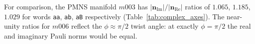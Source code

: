 \documentclass[epjc3]{svjour3}
\begin{document}
\noindent
For comparison, the PMNS manifold $m003$ has
$|\mathbf{n}_{\mathrm{Im}}|/|\mathbf{n}_{\mathrm{Re}}|$
ratios of $1.065$, $1.185$, $1.029$ for words
\texttt{aa}, \texttt{ab}, \texttt{aB} respectively
(Table~\ref{tab:complex_axes}).
The near-unity ratios for $m006$ reflect the $\phi \approx \pi/2$
twist angle: at exactly $\phi = \pi/2$ the real and imaginary
Pauli norms would be equal.



\end{document}
